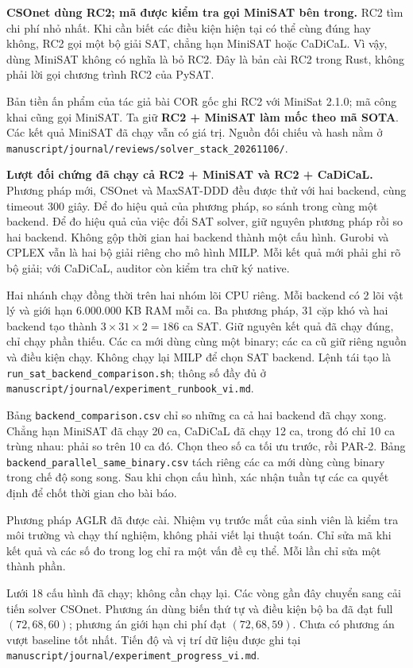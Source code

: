 \documentclass[11pt,a4paper]{article}
\newcommand{\file}[1]{\nolinkurl{#1}}
\begin{document}
\textbf{CSOnet dùng RC2; mã được kiểm tra gọi MiniSAT bên trong.}
RC2 tìm chi phí nhỏ nhất. Khi cần biết các điều kiện hiện tại có thể cùng
đúng hay không, RC2 gọi một bộ giải SAT, chẳng hạn MiniSAT hoặc CaDiCaL.
Vì vậy, dùng MiniSAT không có nghĩa là bỏ RC2. Đây là bản cài RC2 trong
Rust, không phải lời gọi chương trình RC2 của PySAT.

Bản tiền ấn phẩm của tác giả bài COR gốc ghi RC2 với MiniSat 2.1.0; mã công
khai cũng gọi MiniSAT. Ta giữ \textbf{RC2 + MiniSAT làm mốc theo mã SOTA}.
Các kết quả MiniSAT đã chạy vẫn có giá trị. Nguồn đối chiếu và hash nằm ở
\file{manuscript/journal/reviews/solver_stack_20261106/}.

\textbf{Lượt đối chứng đã chạy cả RC2 + MiniSAT và RC2 + CaDiCaL.} Phương pháp
mới, CSOnet và MaxSAT-DDD đều được thử với hai backend, cùng timeout 300 giây.
Để đo hiệu quả của phương pháp, so sánh trong cùng một backend. Để đo hiệu
quả của việc đổi SAT solver, giữ nguyên phương pháp rồi so hai backend.
Không gộp thời gian hai backend thành một cấu hình. Gurobi và CPLEX vẫn
là hai bộ giải riêng cho mô hình MILP. Mỗi kết quả mới phải ghi rõ bộ giải;
với CaDiCaL, auditor còn kiểm tra chữ ký native.

Hai nhánh chạy đồng thời trên hai nhóm lõi CPU riêng. Mỗi backend có 2 lõi
vật lý và giới hạn 6.000.000 KB RAM mỗi ca. Ba phương pháp, 31 cặp khó và
hai backend tạo thành $3\times31\times2=186$ ca SAT. Giữ nguyên kết quả đã
chạy đúng, chỉ chạy phần thiếu. Các ca mới dùng cùng một binary; các ca cũ
giữ riêng nguồn và điều kiện chạy. Không chạy lại MILP để chọn SAT backend.
Lệnh tái tạo là \file{run_sat_backend_comparison.sh}; thông số đầy đủ ở
\file{manuscript/journal/experiment_runbook_vi.md}.

Bảng \file{backend_comparison.csv} chỉ so những ca cả hai backend đã chạy
xong. Chẳng hạn MiniSAT đã chạy 20 ca, CaDiCaL đã chạy 12 ca, trong đó chỉ
10 ca trùng nhau: phải so trên 10 ca đó. Chọn theo số ca tối ưu trước, rồi
PAR-2. Bảng \file{backend_parallel_same_binary.csv} tách riêng các ca mới
dùng cùng binary trong chế độ song song. Sau khi chọn cấu hình, xác nhận
tuần tự các ca quyết định để chốt thời gian cho bài báo.

Phương pháp AGLR đã được cài. Nhiệm vụ trước mắt của sinh viên là kiểm tra môi
trường và chạy thí nghiệm, không phải viết lại thuật toán. Chỉ sửa mã khi kết
quả và các số đo trong log chỉ ra một vấn đề cụ thể. Mỗi lần chỉ sửa một thành
phần.

Lưới 18 cấu hình đã chạy; không cần chạy lại. Các vòng gần đây chuyển sang
cải tiến solver CSOnet. Phương án dùng biến thứ tự và điều kiện bộ ba đã
đạt full $(72,68,60)$; phương án giới hạn chi phí đạt $(72,68,59)$.
Chưa có phương án vượt baseline tốt nhất. Tiến độ và vị trí dữ liệu được ghi tại
\file{manuscript/journal/experiment_progress_vi.md}.
\end{document}
